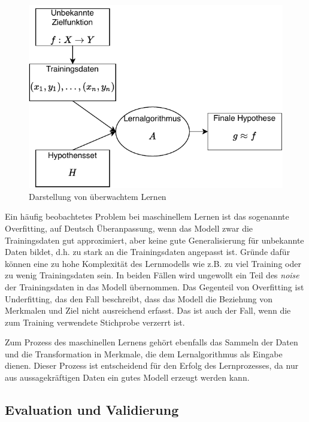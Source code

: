 	\begin{figure}[H]
		\centering
		\includegraphics[scale=0.9]{pic/SupervisedLearning.pdf}
		\caption[Darstellung von überwachtem Lernen]{Darstellung von überwachtem Lernen}
		\label{fig:supervisedLearning}
	\end{figure}

	
	Ein häufig beobachtetes Problem bei maschinellem Lernen ist das sogenannte Overfitting, auf Deutsch Überanpassung, wenn das Modell zwar die Trainingsdaten gut approximiert, aber keine gute Generalisierung für unbekannte Daten bildet, d.h. zu stark an die Trainingsdaten angepasst ist. Gründe dafür können eine zu hohe Komplexität des Lernmodells wie z.B. zu viel Training oder zu wenig Trainingsdaten sein. In beiden Fällen wird ungewollt ein Teil des \textit{noise} der Trainingsdaten in das Modell übernommen. Das Gegenteil von Overfitting ist Underfitting, das den Fall beschreibt, dass das Modell die Beziehung von Merkmalen und Ziel nicht ausreichend erfasst. Das ist auch der Fall, wenn die zum Training verwendete Stichprobe verzerrt ist.
	
	Zum Prozess des maschinellen Lernens gehört ebenfalls das Sammeln der Daten und die Transformation in Merkmale, die dem Lernalgorithmus als Eingabe dienen. Dieser Prozess ist entscheidend für den Erfolg des Lernprozesses, da nur aus aussagekräftigen Daten ein gutes Modell erzeugt werden kann.

	\subsection{Evaluation und Validierung}
	
